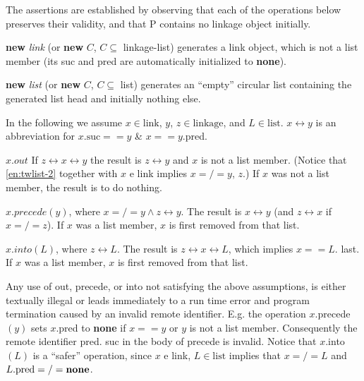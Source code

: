 \documentclass[twoside,11pt]{book}
\begin{document}
The assertions are established by observing that each of the operations
below preserves their validity, and that P contains no linkage object initially.

\noindent
\textbf{new} \textit{link} (or \textbf{new} $C$, $C \subseteq$ linkage-list) generates a link object, which is not a list member (its suc and pred are automatically initialized to \textbf{none}).

\noindent
\textbf{new} \textit{list} (or \textbf{new} $C$, $C \subseteq$ list) generates an ``empty'' circular list containing the generated list head and initially nothing else.

\noindent
In the following we assume $x \in \text{link}$, $y$, $z \in \text{linkage}$, and $L \in \text{list}$. $x \leftrightarrow y$ is an abbreviation for $x.\text{suc} == y$ \& $x == y$.pred.

\noindent
$x.out$ If $z \leftrightarrow x \leftrightarrow y$ the result is $z \leftrightarrow y$ and $x$ is not a list member. (Notice that \ref{en:twlist-2} together with $x$ e link implies $x =/= y$, $z$.) If $x$ was not a list member, the result is to do nothing.

\noindent
$x.precede(y)$, where $x =/= y \land z \leftrightarrow y$. The result is $x \leftrightarrow y$ (and $z \leftrightarrow x$ if $x =/= z$). If $x$ was a list member, $x$ is first removed from that list.

\noindent
$x.into(L)$, where $z \leftrightarrow L$. The result is $z \leftrightarrow x \leftrightarrow L$, which implies $x == L$. last. If $x$ was a list member, $x$ is first removed from that list.

Any use of out, precede, or into not satisfying the above assumptions, is either textually illegal or leads immediately to a run time error and program termination caused by an invalid remote identifier. E.g. the operation $x$.precede$(y)$ sets $x$.pred to \textbf{none} if $x == y$ or $y$ is not a list member. Consequently the remote identifier pred. suc in the body of precede is invalid. Notice that $x$.into$(L)$ is a ``safer'' operation, since $x$ e link, $L \in \text{list}$ implies that $x =/= L$ and $L.\text{pred} =/= \text{\textbf{none}}$.
\end{document}
